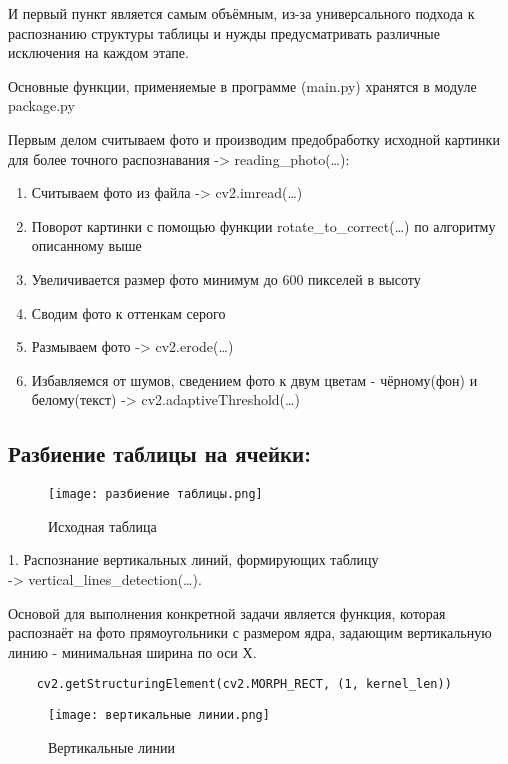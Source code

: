 \documentclass[a4paper, 12pt]{report}
\begin{document}
И первый пункт является самым объёмным, из-за универсального подхода к распознанию структуры таблицы и нужды предусматривать различные исключения на каждом этапе.

Основные функции, применяемые в программе (main.py) хранятся в модуле package.py

Первым делом считываем фото и производим предобработку исходной картинки для более точного распознавания -> reading\_photo(…):

\begin{enumerate}
    \item Считываем фото из файла -> cv2.imread(…)
    \item Поворот картинки с помощью функции rotate\_to\_correct(…) по алгоритму описанному выше
    \item Увеличивается размер фото минимум до 600 пикселей в высоту %
    \item Сводим фото к оттенкам серого
    \item Размываем фото -> cv2.erode(…)
    \item Избавляемся от шумов, сведением фото к двум цветам - чёрному(фон) и белому(текст) -> cv2.adaptiveThreshold(…)
\end{enumerate}

\pagebreak
\subsection*{Разбиение таблицы на ячейки:}
\begin{figure}[ht]
    \centering
    \texttt{[image: разбиение таблицы.png]}
    \caption{Исходная таблица}
    \label{fig:my_label}
\end{figure}

1. Распознание вертикальных линий, формирующих таблицу\\ -> vertical\_lines\_detection(…).

Основой для выполнения конкретной задачи является функция, которая распознаёт на фото прямоугольники с размером ядра, задающим вертикальную линию - минимальная ширина по оси Х.
\begin{lstlisting}
    cv2.getStructuringElement(cv2.MORPH_RECT, (1, kernel_len))
\end{lstlisting}

\begin{figure}[ht]
    \centering
    \texttt{[image: вертикальные линии.png]}
    \caption{Вертикальные линии}
    \label{fig:my_label}
\end{figure}
\end{document}

